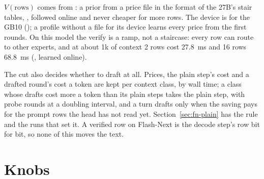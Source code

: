 $V(\text{rows})$ comes from : a prior from a price file in the format of the 27B's stair tables, , followed online and never cheaper for more rows. The device is  for the GB10 (); a profile without a file for its device learns every price from the first rounds. On this model the verify is a ramp, not a staircase: every row can route to other experts, and at about 1k of context 2 rows cost 27.8~ms and 16 rows 68.8~ms (\measured, learned online).

The cut also decides whether to draft at all. Prices, the plain step's cost and a drafted round's cost a token are kept per context class, by wall time; a class whose drafts cost more a token than its plain steps takes the plain step, with probe rounds at a doubling interval, and a turn drafts only when the saving pays for the prompt rows the head has not read yet. Section~\ref{sec:fn-plain} has the rule and the runs that set it. A verified row on Flash-Next is the decode step's row bit for bit, so none of this moves the text.

\section{Knobs}

